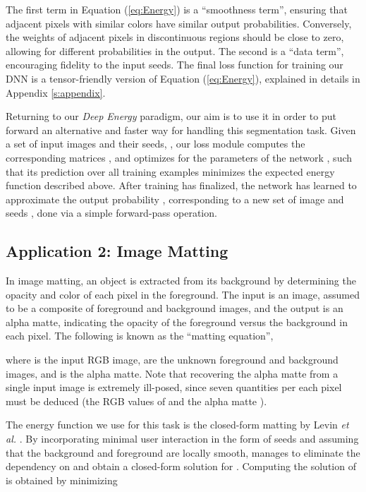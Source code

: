 \documentclass[journal]{IEEEtran}
\begin{document}
The first term in Equation (\ref{eq:Energy}) is a ``smoothness term'', ensuring that adjacent pixels with similar colors have similar output probabilities. Conversely, the weights of adjacent pixels in discontinuous regions should be close to zero, allowing for different probabilities in the output. The second is a ``data term'', encouraging fidelity to the input seeds. The final loss function for training our DNN is a tensor-friendly version of Equation (\ref{eq:Energy}), explained in details in Appendix \ref{s:appendix}. 

Returning to our  \emph{Deep Energy} paradigm, our aim is to use it in order to put forward an alternative and faster way for handling this segmentation task. Given a set of input images and their seeds, , our loss module computes the corresponding matrices , and optimizes for the parameters  of the network , such that its prediction over all training examples  minimizes the expected energy function described above. After training has finalized, the network has learned to approximate the output probability , corresponding to a new set of image and seeds , done via a simple forward-pass operation.



\subsection{Application 2: Image Matting} \label{ss:matting}

In image matting, an object is extracted from its background by determining the opacity and color of each pixel in the foreground. The input is an image, assumed to be a composite of foreground and background images, and the output is an alpha matte, indicating the opacity of the foreground versus the background in each pixel. The following is known as the ``matting equation'',

where  is the input RGB image,  are the unknown foreground and background images, and  is the alpha matte. Note that recovering the alpha matte from a single input image is extremely ill-posed, since seven quantities per each pixel must be deduced (the RGB values of  and the alpha matte ).

The energy function we use for this task is the closed-form matting by Levin \textit{et al.} \cite{closed_form_matting}. By incorporating minimal user interaction in the form of seeds and assuming that the background and foreground are locally smooth, \cite{closed_form_matting} manages to eliminate the dependency on  and obtain a closed-form solution for . Computing the solution of  is obtained by minimizing 
\end{document}
